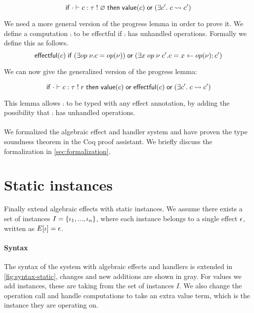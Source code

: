 {\begin{lemma}[Progress]
\[
	\mathsf{if}\;
		\cdot \vdash c : \tau \; ! \; \varnothing
	\;\mathsf{then}\;
		\mathsf{value}(c)
		\;\mathsf{or}\;
		(\exists c'.\; c \rightsquigarrow c')
\]
\end{lemma}

We need a more general version of the progress lemma in order to prove it.
We define a computation $\comp$ to be effectful if $\comp$ has unhandled operations.
Formally we define this as follows.
	\[ \mathsf{effectful}(c) \;\mathsf{if}\; (\exists op \; \nu. c = op(\nu)) \;\mathsf{or}\; (\exists x \; op \; \nu \; c'. c = x \leftarrow op(\nu) ; c') \]

We can now give the generalized version of the progress lemma:

\begin{lemma}
\[
	\mathsf{if}\;
		\cdot \vdash c : \tau \; ! \; r
	\;\mathsf{then}\;
		\mathsf{value}(c)
		\;\mathsf{or}\;
		\mathsf{effectful}(c)
		\;\mathsf{or}\;
		(\exists c'.\; c \rightsquigarrow c')
\]
\end{lemma}

This lemma allows $\comp$ to be typed with any effect annotation, by adding the possibility that $\comp$ has unhandled operations.
\\\\
We formalized the algebraic effect and handler system and have proven the type soundness theorem in the Coq proof assistant.
We briefly discuss the formalization in \cref{sec:formalization}.

\newpage
\section{Static instances} \label{sec:theory-staticinst}

Finally extend algebraic effects with static instances. We assume there exists a set of instances $I = \{ \iota_1, ..., \iota_n \}$, where each instance belongs to a single effect $\epsilon$, written as $E[\iota] = \epsilon$.

\paragraph{Syntax}
The syntax of the system with algebraic effects and handlers is extended in \cref{fig:syntax-static}, changes and new additions are shown in gray. For values we add instances, these are taking from the set of instances $I$. We also change the operation call and handle computations to take an extra value term, which is the instance they are operating on.

}
